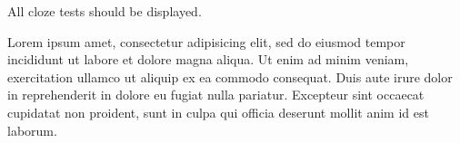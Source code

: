\documentclass{article}
\begin{document}
{All cloze tests should be displayed.}

Lorem ipsum  amet, consectetur adipisicing elit, sed do
eiusmod tempor incididunt ut labore et dolore magna aliqua. Ut enim ad
minim veniam,  exercitation ullamco  ut aliquip ex ea commodo consequat. Duis aute irure dolor in
reprehenderit in  dolore eu fugiat
nulla pariatur. Excepteur sint occaecat cupidatat non proident, sunt in
culpa qui officia deserunt mollit anim id est laborum.
\end{document}
